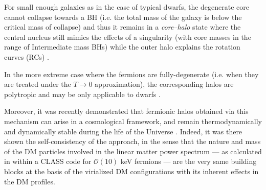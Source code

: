 \begin{asparaenum}[(1)]
    \item For small enough galaxies as in the case of typical dwarfs, the degenerate core cannot collapse towards a BH (i.e. the total mass of the galaxy is below the critical mass of collapse) and thus it remains in a \textit{core}--\textit{halo} state where the central nucleus still mimics the effects of a singularity (with core masses in the range of Intermediate mass BHs) while the outer halo explains the rotation curves (RCs) \citep{2019PDU....24..278A,2021MNRAS.502.4227A,2022IJMPD..3130002A}.
    
    \item In the more extreme case where the fermions are fully-degenerate (i.e. when they are treated under the $T \to 0$ approximation), the corresponding halos are polytropic and may be only applicable to dwarfs \citep{2015JCAP...01..002D}.
\end{asparaenum}

Moreover, it was recently demonstrated that fermionic halos obtained via this  mechanism can arise in a cosmological framework, and remain thermodynamically and dynamically stable during the life of the Universe \citep{2021MNRAS.502.4227A}. Indeed, it was there shown the self-consistency of the approach, in the sense that the nature and mass of the DM particles involved in the linear matter power spectrum --- as calculated in \citet{2021MNRAS.502.4227A} within a CLASS code for $\mathcal{O}(10)$ keV fermions --- are the very same building blocks at the basis of the virialized DM configurations with its inherent effects in the DM profiles. 



